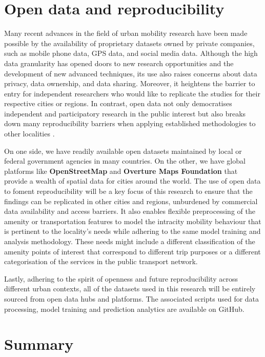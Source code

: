 \section{Open data and reproducibility}

Many recent advances in the field of urban mobility research have been made possible by the availability of proprietary datasets owned by private companies, such as mobile phone data, GPS data, and social media data. Although the high data granularity has opened doors to new research opportunities and the development of new advanced techniques, its use also raises concerns about data privacy, data ownership, and data sharing. Moreover, it heightens the barrier to entry for independent researchers who would like to replicate the studies for their respective cities or regions. In contrast, open data not only democratises independent and participatory research in the public interest but also breaks down many reproducibility barriers when applying established methodologies to other localities \citep{yadavRoleOpenData2017}.

On one side, we have readily available open datasets maintained by local or federal government agencies in many countries. On the other, we have global platforms like \textbf{OpenStreetMap} and \textbf{Overture Maps Foundation} that provide a wealth of spatial data for cities around the world. The use of open data to foment reproducibility will be a key focus of this research to ensure that the findings can be replicated in other cities and regions, unburdened by commercial data availability and access barriers. It also enables flexible preprocessing of the amenity or transportation features to model the intracity mobility behaviour that is pertinent to the locality's needs while adhering to the same model training and analysis methodology. These needs might include a different classification of the amenity points of interest that correspond to different trip purposes or a different categorisation of the services in the public transport network. 

Lastly, adhering to the spirit of openness and future reproducibility across different urban contexts, all of the datasets used in this research will be entirely sourced from open data hubs and platforms. The associated scripts used for data processing, model training and prediction analytics are available on GitHub.

\section{Summary}

